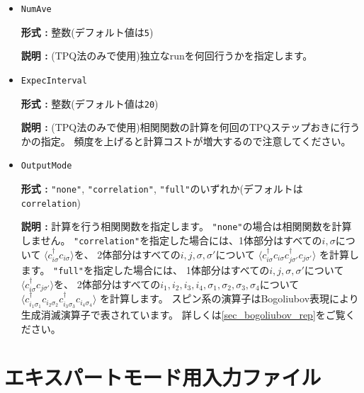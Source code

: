 \begin{itemize}
\item \verb|NumAve|

{\bf 形式 :} 整数(デフォルト値は\verb|5|)

{\bf 説明 :} (TPQ法のみで使用)独立なrunを何回行うかを指定します。

\item \verb|ExpecInterval|

{\bf 形式 :} 整数(デフォルト値は\verb|20|)

{\bf 説明 :} (TPQ法のみで使用)相関関数の計算を何回のTPQステップおきに行うかの指定。
頻度を上げると計算コストが増大するので注意してください。

\item \verb|OutputMode|

{\bf 形式 :} \verb|"none"|, \verb|"correlation"|, \verb|"full"|のいずれか(デフォルトは\verb|correlation|)

{\bf 説明 :} 計算を行う相関関数を指定します。
\verb|"none"|の場合は相関関数を計算しません。
\verb|"correlation"|を指定した場合には、1体部分はすべての$i, \sigma$について
$\langle c_{i \sigma}^{\dagger}c_{i \sigma} \rangle$を、
2体部分はすべての$i, j, \sigma, \sigma'$について
$\langle c_{i \sigma}^{\dagger}c_{i \sigma} c_{j \sigma'}^{\dagger}c_{j \sigma'} \rangle$
を計算します。
\verb|"full"|を指定した場合には、
1体部分はすべての$i, j, \sigma, \sigma'$について
$\langle c_{i \sigma}^{\dagger}c_{j \sigma'} \rangle$を、
2体部分はすべての$i_1, i_2, i_3, i_4, \sigma_1, \sigma_2, \sigma_3, \sigma_4$について
$\langle c_{i_1 \sigma_1}^{\dagger}c_{i_2 \sigma_2} c_{i_3 \sigma_3}^{\dagger}c_{i_4 \sigma_4} \rangle$
を計算します。
スピン系の演算子はBogoliubov表現により生成消滅演算子で表されています。
詳しくは\ref{sec_bogoliubov_rep}をご覧ください。

\end{itemize}

\newpage
\section{エキスパートモード用入力ファイル}
\label{Ch:HowToExpert}


